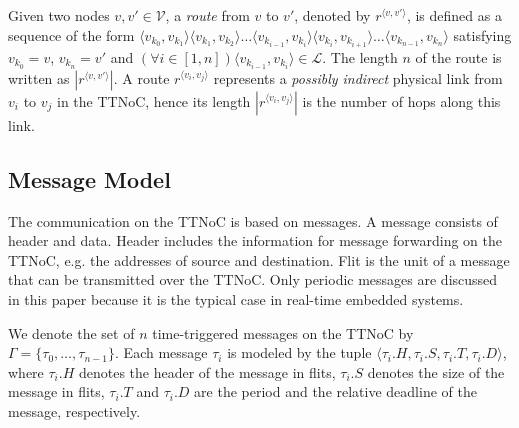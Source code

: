 \documentclass[journal]{IEEEtran}
\newcommand{\calV}{\mathcal{V}}
\newcommand{\calL}{\mathcal{L}}
\newcommand{\route}[3]{#1^{\langle #2,#3\rangle}}
\theoremstyle{remark}
\begin{document}
Given two nodes $v,v'\in\calV$, a \emph{route} from $v$ to $v'$,
 denoted by $\route{r}{v}{v'}$, is defined as a sequence of the form 
 $\langle v_{k_0},v_{k_1}\rangle\langle
v_{k_1},v_{k_2}\rangle\ldots\langle v_{k_{i-1}},v_{k_i}\rangle\langle
v_{k_i},v_{k_{i+1}}\rangle\ldots \langle v_{k_{n-1}},v_{k_n}\rangle$
satisfying $v_{k_0}=v$, $v_{k_n}=v'$ and $(\forall i\in [1,n])\langle
v_{k_{i-1}},v_{k_i}\rangle \in\calL$. The length $n$ of the route is
written as $|\route{r}{v}{v'}|$. A route $\route{r}{v_i}{v_j}$
represents a \emph{possibly indirect} physical link from $v_i$ to
$v_j$ in the TTNoC, hence its length $|\route{r}{v_i}{v_j}|$ is the
number of hops along this link.



\subsection{Message Model}

The communication on the TTNoC is based on messages.  
A message consists of header and data.  
Header includes the information for message forwarding on the TTNoC,
 e.g. the addresses of source and destination. 
Flit is the unit of a message that can be transmitted over the TTNoC.  
Only periodic messages are discussed in this paper because it is the typical case in real-time embedded systems.

We denote the set of $n$ time-triggered messages on the TTNoC by $\Gamma = \{\tau_{0},\dots,\tau_{n-1}\}$. 
Each message $\tau_{i}$ is modeled by the tuple $\langle \tau_{i}.H,\tau_{i}.S, \tau_{i}.T,\tau_{i}.D\rangle$, 
 where $\tau_{i}.H$ denotes the header of the message in flits,
 $\tau_{i}.S$ denotes the size of the message in flits, 
 $\tau_{i}.T$ and $\tau_{i}.D$ are the period and the relative deadline of the message, respectively.
 
\end{document}
